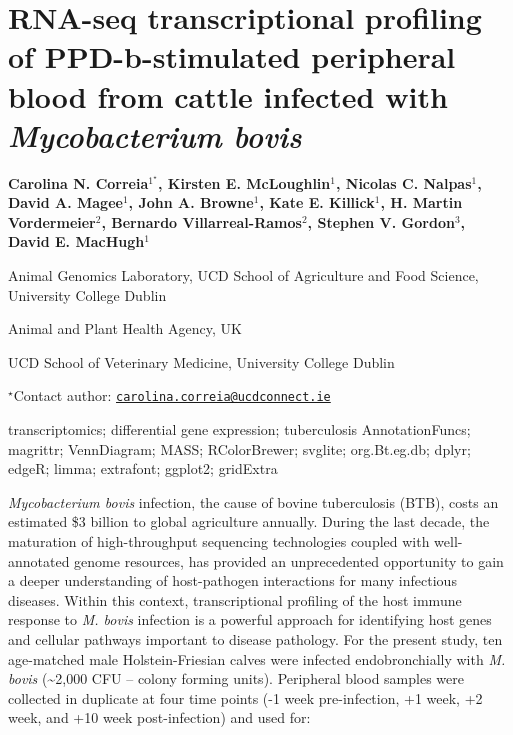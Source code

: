 \documentclass[\main/boa.tex]{subfiles}
\begin{document}
\pagestyle{empty}

\section{RNA-seq transcriptional profiling of PPD-b-stimulated peripheral blood
from cattle infected with \emph{Mycobacterium bovis}}

\begin{center}
  {\bf Carolina N. Correia$^{1^\star}$, Kirsten E. McLoughlin$^{1}$, Nicolas C. Nalpas$^{1}$, David A. Magee$^{1}$, John A. Browne$^{1}$, Kate E. Killick$^{1}$, H. Martin Vordermeier$^{2}$, Bernardo Villarreal-Ramos$^{2}$, Stephen V. Gordon$^{3}$, David E. MacHugh$^{1}$}
\end{center}

\vskip 0.3cm

\begin{affiliations}
\begin{enumerate}
\begin{minipage}{0.915\textwidth}
\centering
\item Animal Genomics Laboratory, UCD School of Agriculture and Food Science,
University College Dublin \\[-2pt]
\item Animal and Plant Health Agency, UK \\[-2pt]
\item UCD School of Veterinary Medicine, University College Dublin \\[-2pt]
\end{minipage}
\end{enumerate}
$^\star$Contact author: \href{mailto:carolina.correia@ucdconnect.ie}{\nolinkurl{carolina.correia@ucdconnect.ie}}\\
\end{affiliations}

\vskip 0.5cm

\begin{minipage}{0.915\textwidth}
\keywords transcriptomics; differential gene expression; tuberculosis
\packages AnnotationFuncs; magrittr; VennDiagram; MASS; RColorBrewer; svglite;
org.Bt.eg.db; dplyr; edgeR; limma; extrafont; ggplot2; gridExtra
\end{minipage}

\vskip 0.8cm

\emph{Mycobacterium bovis} infection, the cause of bovine tuberculosis
(BTB), costs an estimated \$3 billion to global agriculture annually.
During the last decade, the maturation of high-throughput sequencing
technologies coupled with well-annotated genome resources, has provided
an unprecedented opportunity to gain a deeper understanding of
host-pathogen interactions for many infectious diseases. Within this
context, transcriptional profiling of the host immune response to
\emph{M. bovis} infection is a powerful approach for identifying host
genes and cellular pathways important to disease pathology. For the
present study, ten age-matched male Holstein-Friesian calves were
infected endobronchially with \emph{M. bovis} (\textasciitilde{}2,000
CFU -- colony forming units). Peripheral blood samples were collected in
duplicate at four time points (-1 week pre-infection, +1 week, +2 week,
and +10 week post-infection) and used for:
\end{document}
